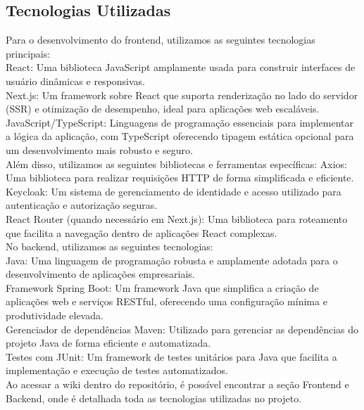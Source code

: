 \subsection{Tecnologias Utilizadas}
  Para o desenvolvimento do frontend, utilizamos as seguintes tecnologias principais:\\
React: Uma biblioteca JavaScript amplamente usada para construir interfaces de usuário dinâmicas e responsivas.\\
Next.js: Um framework sobre React que suporta renderização no lado do servidor (SSR) e otimização de desempenho, ideal para aplicações web escaláveis.\\
JavaScript/TypeScript: Linguagens de programação essenciais para implementar a lógica da aplicação, com TypeScript oferecendo tipagem estática opcional para um desenvolvimento mais robusto e seguro.\\

Além disso, utilizamos as seguintes bibliotecas e ferramentas específicas:
Axios: Uma biblioteca para realizar requisições HTTP de forma simplificada e eficiente.\\

Keycloak: Um sistema de gerenciamento de identidade e acesso utilizado para autenticação e autorização seguras.\\
React Router (quando necessário em Next.js): Uma biblioteca para roteamento que facilita a navegação dentro de aplicações React complexas.\\

No backend, utilizamos as seguintes tecnologias:\\
Java: Uma linguagem de programação robusta e amplamente adotada para o desenvolvimento de aplicações empresariais.\\
Framework Spring Boot: Um framework Java que simplifica a criação de aplicações web e serviços RESTful, oferecendo uma configuração mínima e produtividade elevada.\\
Gerenciador de dependências Maven: Utilizado para gerenciar as dependências do projeto Java de forma eficiente e automatizada.\\
Testes com JUnit: Um framework de testes unitários para Java que facilita a implementação e execução de testes automatizados.\\

Ao acessar a wiki dentro do repositório, é possível encontrar a seção Frontend e Backend, onde é detalhada toda as tecnologias utilizadas no projeto.
